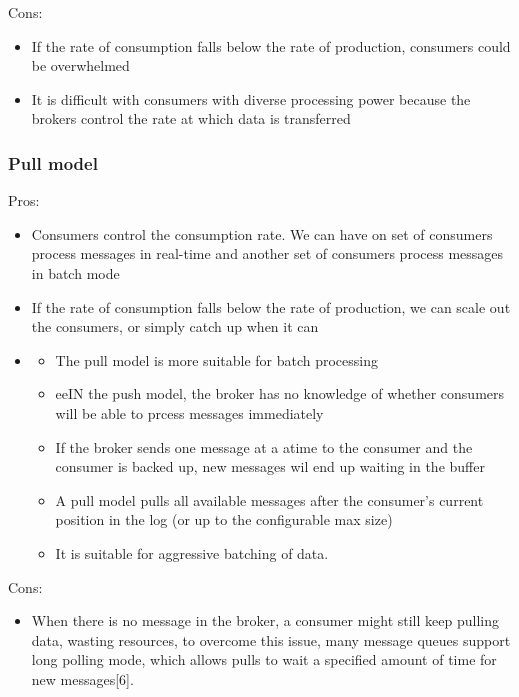 \documentclass{report}
\theoremstyle{definition}
\let\oldsubsubsection\subsubsection
\renewcommand{\subsubsection}{\oldsubsubsection*}
\begin{document}
Cons:

\begin{itemize}
\item
If the rate of consumption falls below the rate of production, consumers could be overwhelmed
\item
It is difficult with consumers with diverse processing power because the brokers control the rate at which data is transferred
\end{itemize}

\subsubsection{Pull model}

Pros:

\begin{itemize}
\item
Consumers control the consumption rate. We can have on set of consumers process messages in real-time and another set of consumers process messages in batch mode
\item
If the rate of consumption falls below the rate of production, we can scale out the consumers, or simply catch up when it can
\item
\begin{itemize}
\item
The pull model is more suitable for batch processing
\item
eeIN the push model, the broker has no knowledge of whether consumers will be able to prcess messages immediately
\item
If the broker sends one message at a atime to the consumer and the consumer is backed up, new messages wil end up waiting in the buffer
\item
A pull model pulls all available messages after the consumer's current position in the log (or up to the configurable max size)
\item
It is suitable for aggressive batching of data.
\end{itemize}
\end{itemize}

Cons:

\begin{itemize}
\item
When there is no message in the broker, a consumer might still keep pulling data, wasting resources, to overcome this issue, many message queues support long polling mode, which allows pulls to wait a specified amount of time for new messages[6].
\end{itemize}
\end{document}
